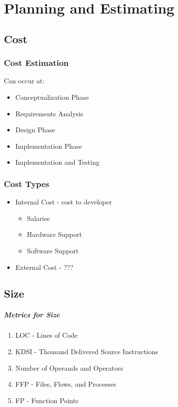 \documentclass{report}
\begin{document}
	\chapter{Planning and Estimating}
		\section{Cost}
			\subsection{Cost Estimation}
				Can occur at:
					\begin{itemize}
						\item Conceptualization Phase
						\item Requirements Analysis
						\item Design Phase
						\item Implementation Phase
						\item Implementation and Testing
					\end{itemize}
			\subsection{Cost Types}
				\begin{itemize}
					\item Internal Cost - cost to developer
						\begin{itemize}
							\item Salaries
							\item Hardware Support
							\item Software Support
						\end{itemize}
					\item External Cost - ???
				\end{itemize}
		\section{Size}
			\paragraph{Metrics for Size}
				\begin{enumerate}
					\item LOC - Lines of Code
					\item KDSI - Thousand Delivered Source Instructions
					\item Number of Operands and Operators
					\item FFP - Files, Flows, and Processes
					\item FP - Function Points
				\end{enumerate}
\end{document}
